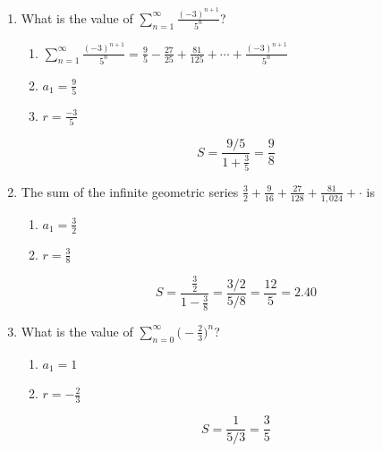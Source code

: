\documentclass[12pt]{article}
\begin{document}
\begin{enumerate}
	\item What is the value of $\sum_{n=1}^{\infty} \frac{(-3)^{n+1}}{5^n}$?
	\begin{enumerate}
		\item $\sum_{n=1}^{\infty} \frac{(-3)^{n+1}}{5^n} = \frac{9}{5} - \frac{27}{25} + \frac{81}{125}  + \cdots + \frac{(-3)^{n+1}}{5^n}$
		\item $a_1 = \frac{9}{5}$
		\item $r= \frac{-3}{5}$
	\end{enumerate}
	$$S = \frac{9/5}{1+ \frac{3}{5}} = \boxed{\frac{9}{8}}$$
	\item The sum of the infinite geometric series $\frac{3}{2} + \frac{9}{16} + \frac{27}{128} + \frac{81}{1,024} + \cdot$ is
	\begin{enumerate}
		\item $a_1 = \frac{3}{2}$
		\item $r= \frac{3}{8}$
	\end{enumerate}
	$$S = \frac{\frac{3}{2}}{1-\frac{3}{8}} = \frac{3/2}{5/8} = \frac{12}{5} = \boxed{2.40}$$
	\item What is the value of $\sum_{n=0}^{\infty} \big(-\frac{2}{3}\big)^n$?
	\begin{enumerate}
		\item $a_1 = 1$
		\item $r= -\frac{2}{3}$
	\end{enumerate}
	$$S = \frac{1}{5/3} = \boxed{\frac{3}{5}}$$
\end{enumerate}
\end{document}
